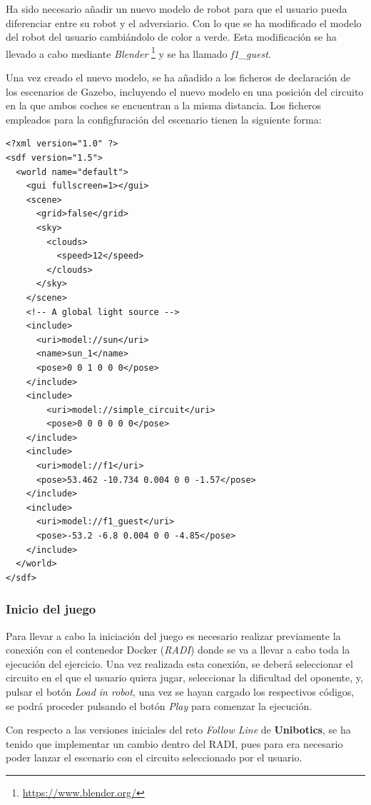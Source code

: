 \documentclass[a4paper, 12pt]{book}
\begin{document}
Ha sido necesario añadir un nuevo modelo de robot para que el usuario pueda diferenciar entre su robot y el adversiario. Con lo que se ha modificado el modelo del robot del usuario cambiándolo de color a verde. Esta modificación se ha llevado a cabo mediante \emph{Blender} \footnote{\url{https://www.blender.org/}} y se ha llamado \emph{f1\_guest}.

Una vez creado el nuevo modelo, se ha añadido a los ficheros de declaración de los escenarios de Gazebo, incluyendo el nuevo modelo en una posición del circuito en la que ambos coches se encuentran a la misma distancia. Los ficheros empleados para la configfuración del escenario tienen la siguiente forma:

\begin{lstlisting}
<?xml version="1.0" ?>
<sdf version="1.5">
  <world name="default">
    <gui fullscreen=1></gui>
    <scene>
      <grid>false</grid>
      <sky>
        <clouds>
          <speed>12</speed>
        </clouds>
      </sky>
    </scene>
    <!-- A global light source -->
    <include>
      <uri>model://sun</uri>
      <name>sun_1</name>
      <pose>0 0 1 0 0 0</pose>
    </include>
    <include>
	    <uri>model://simple_circuit</uri>
	    <pose>0 0 0 0 0 0</pose>
    </include>
    <include>
      <uri>model://f1</uri>
      <pose>53.462 -10.734 0.004 0 0 -1.57</pose>
    </include>
    <include>
      <uri>model://f1_guest</uri>
      <pose>-53.2 -6.8 0.004 0 0 -4.85</pose>
    </include>
  </world>
</sdf>
\end{lstlisting}


\subsubsection{Inicio del juego}
\label{subsec:follow_line_game_inicio}

Para llevar a cabo la iniciación del juego es necesario realizar previamente la conexión con el contenedor Docker (\emph{RADI}) donde se va a llevar a cabo toda la ejecución del ejercicio. Una vez realizada esta conexión, se deberá seleccionar el circuito en el que el usuario quiera jugar, seleccionar la dificultad del oponente, y, pulsar el botón \emph{Load in robot}, una vez se hayan cargado los respectivos códigos, se podrá proceder pulsando el botón \emph{Play} para comenzar la ejecución.

Con respecto a las versiones iniciales del reto \emph{Follow Line} de \textbf{Unibotics}, se ha tenido que implementar un cambio dentro del RADI, pues para era necesario poder lanzar el escenario con el circuito seleccionado por el usuario.
\end{document}
